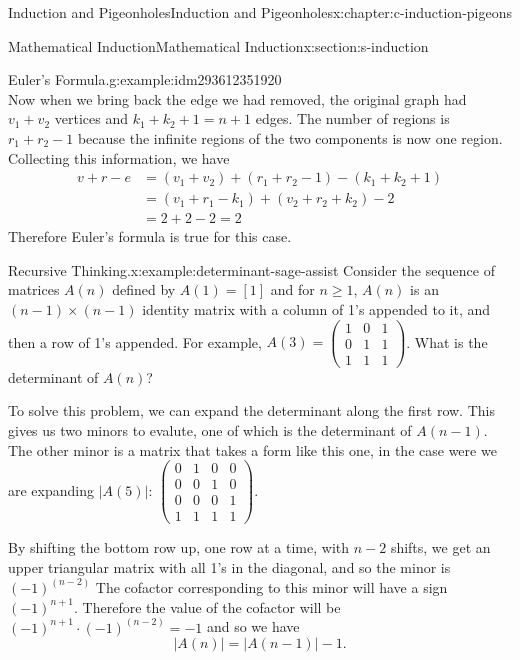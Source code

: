 \documentclass[twoside,10pt,]{book}
\numberwithin{equation}{section}
\begin{document}
\begin{chapterptx}{Induction and Pigeonholes}{}{Induction and Pigeonholes}{}{}{x:chapter:c-induction-pigeons}
\begin{sectionptx}{Mathematical Induction}{}{Mathematical Induction}{}{}{x:section:s-induction}
\begin{example}{Euler's Formula.}{g:example:idm293612351920}
\begin{equation*}
\end{equation*}
Now when we bring back the edge we had removed, the original graph had \(v_1+ v_2\) vertices and \(k_1+k_2+1= n+1\) edges.  The number of regions is \(r_1+ r_2-1\) because the infinite regions of the two components  is now one region.  Collecting this information, we have%
\begin{equation*}
\begin{split}
v+r-e &= \left(v_1+v_2\right)+\left(r_1+ r_2-1\right) -\left(k_1+k_2+1\right)\\
& = \left(v_1+r_1-k_1\right)+ \left(v_2+r_2+k_2\right) -2\\
&=2+2-2 = 2
\end{split}
\end{equation*}
Therefore Euler's formula is true for this case.%
\end{example}
\begin{example}{Recursive Thinking.}{x:example:determinant-sage-assist}%
Consider the sequence of  matrices \(A(n)\) defined by \(A(1)=[1]\) and for \(n \ge 1\), \(A(n)\) is an \((n-1) \times (n-1)\) identity matrix with a column of 1's appended to it, and then a row of 1's appended.  For example, \(A(3)=\begin{pmatrix}1 & 0 & 1\\
0 & 1 & 1\\
1 & 1 & 1 \end{pmatrix}\). What is the determinant of \(A(n)\)?%
\par
To solve this problem, we can expand the determinant along the first row.  This gives us two minors to evalute, one of which is the determinant of \(A(n-1)\).  The other minor is a matrix that takes a form like this one, in the case were we are expanding \(\lvert A(5)\rvert\): \(\begin{pmatrix}
0 & 1 & 0 & 0\\
0 & 0 & 1 & 0\\
0 & 0 & 0 & 1\\
1 & 1 & 1 & 1 \end{pmatrix}\).%
\par
By shifting the bottom row up, one row at a time, with \(n-2\) shifts, we get an upper triangular matrix with all 1's in the diagonal, and so the minor is  \((-1)^{(n-2)}\)  The cofactor corresponding to this minor will have a sign \((-1)^{n+1}\).  Therefore the value of the cofactor will be \((-1)^{n+1}\cdot (-1)^{(n-2)}= -1\) and so we have%
\begin{equation*}
\lvert A(n) \rvert = \lvert A(n-1) \rvert -1\text{.}

\end{equation*}
\end{example}
\end{sectionptx}
\end{chapterptx}
\end{document}
